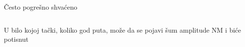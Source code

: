 \begin{frame}[label=08-s025]{Često pogrešno shvaćeno}
\centering\par
\begin{columns}[T,onlytextwidth]\gusttekst
U bilo kojoj tački, koliko god puta, može da se pojavi šum amplitude NM i biće potisnut
\centering\end{columns}
\end{frame}
